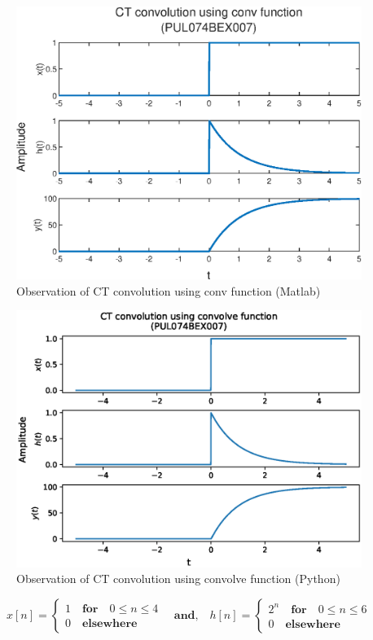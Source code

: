 \documentclass{lab_sheet}
\begin{document}
    \begin{figure}[H]
        \centering
        \includegraphics[width=0.73\linewidth]{../Figures/lab_3_2_b_ml.eps}
        \caption{Observation of CT convolution using conv function (Matlab)}
        \label{fig:3_2_b_ml}
    \end{figure}
    \begin{figure}[H]
        \centering
        \includegraphics[width=0.8\linewidth]{../Figures/lab_3_2_b_py.eps}
        \caption{Observation of CT convolution using convolve function (Python)}
        \label{fig:3_2_b_py}
    \end{figure}
    \begin{equation*}
        x[n]=\begin{cases}
            1 \quad \textbf{for} \quad 0\leq n \leq 4\\
            0 \quad \textbf{elsewhere}
        \end{cases}
       \quad \textbf{and,} \quad h[n]=\begin{cases}
            2^n \quad \textbf{for} \quad 0\leq n \leq 6\\
            0 \quad \textbf{elsewhere}
        \end{cases}
    \end{equation*}
\end{document}
